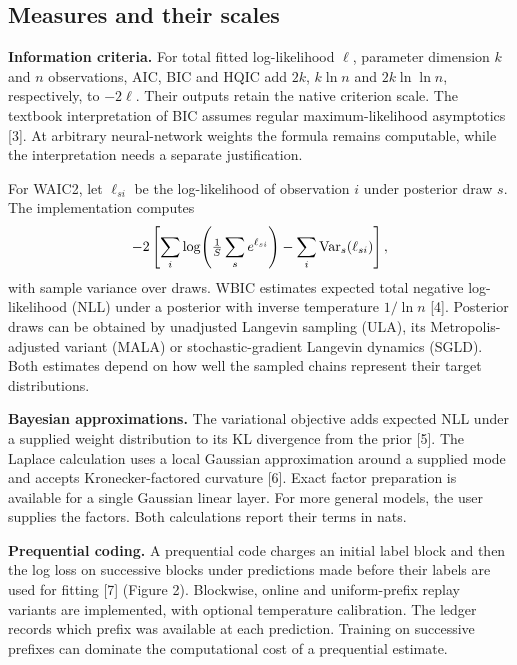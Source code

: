 \documentclass[10pt,a4paper]{article}
\begin{document}
\subsection*{Measures and their scales}
\textbf{Information criteria.} For total fitted log-likelihood $\ell$, parameter dimension $k$ and $n$ observations, AIC, BIC and HQIC add $2k$, $k\ln n$ and $2k\ln\ln n$, respectively, to $-2\ell$. Their outputs retain the native criterion scale. The textbook interpretation of BIC assumes regular maximum-likelihood asymptotics [3]. At arbitrary neural-network weights the formula remains computable, while the interpretation needs a separate justification.

For WAIC2, let $\ell_{si}$ be the log-likelihood of observation $i$ under posterior draw $s$. The implementation computes
\[
 -2\left[\sum_i \log\!\left(\tfrac1S\sum_s e^{\ell_{si}}\right)
       - \sum_i {\rm Var}_{s}(\ell_{si})\right],
\]
with sample variance over draws. WBIC estimates expected total negative log-likelihood (NLL) under a posterior with inverse temperature $1/\ln n$ [4]. Posterior draws can be obtained by unadjusted Langevin sampling (ULA), its Metropolis-adjusted variant (MALA) or stochastic-gradient Langevin dynamics (SGLD). Both estimates depend on how well the sampled chains represent their target distributions.

\textbf{Bayesian approximations.} The variational objective adds expected NLL under a supplied weight distribution to its KL divergence from the prior [5]. The Laplace calculation uses a local Gaussian approximation around a supplied mode and accepts Kronecker-factored curvature [6]. Exact factor preparation is available for a single Gaussian linear layer. For more general models, the user supplies the factors. Both calculations report their terms in nats.

\textbf{Prequential coding.} A prequential code charges an initial label block and then the log loss on successive blocks under predictions made before their labels are used for fitting [7] (Figure 2). Blockwise, online and uniform-prefix replay variants are implemented, with optional temperature calibration. The ledger records which prefix was available at each prediction. Training on successive prefixes can dominate the computational cost of a prequential estimate.
\end{document}
